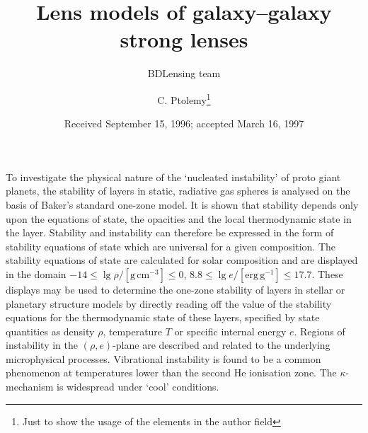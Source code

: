 \documentclass{aa}
\begin{document}
 


   \title{Lens models of galaxy--galaxy strong lenses}

   \subtitle{}

   \author{BDLensing team
          \and
          C. Ptolemy\fnmsep\thanks{Just to show the usage
          of the elements in the author field}
          }


   \date{Received September 15, 1996; accepted March 16, 1997}

 
  \abstract
   {To investigate the physical nature of the `nuc\-leated instability' of
   proto giant planets, the stability of layers
   in static, radiative gas spheres is analysed on the basis of Baker's
   standard one-zone model.}
   {It is shown that stability
   depends only upon the equations of state, the opacities and the local
   thermodynamic state in the layer. Stability and instability can
   therefore be expressed in the form of stability equations of state
   which are universal for a given composition.}
   {The stability equations of state are
   calculated for solar composition and are displayed in the domain
   $-14 \leq \lg \rho / \mathrm{[g\, cm^{-3}]} \leq 0 $,
   $ 8.8 \leq \lg e / \mathrm{[erg\, g^{-1}]} \leq 17.7$. These displays
   may be
   used to determine the one-zone stability of layers in stellar
   or planetary structure models by directly reading off the value of
   the stability equations for the thermodynamic state of these layers,
   specified
   by state quantities as density $\rho$, temperature $T$ or
   specific internal energy $e$.
   Regions of instability in the $(\rho,e)$-plane are described
   and related to the underlying microphysical processes.}
   {Vibrational instability is found to be a common phenomenon
   at temperatures lower than the second He ionisation
   zone. The $\kappa$-mechanism is widespread under `cool'
   conditions.}
   {}
\end{document}
